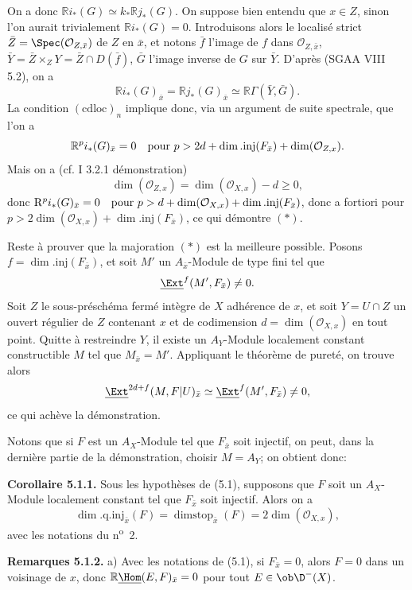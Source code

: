 On a
donc $\mathbb{R} i_*(G)\simeq k_*\mathbb{R} j_*(G)$. On suppose bien entendu que $x\in Z$, sinon l'on aurait trivialement $\mathbb{R} i_*(G)=0$. Introduisons alors le localisé strict $\bar{Z}=\Spec(\mathcal{O}_{Z,\bar{x}})$ de $Z$ en $\bar{x}$, et notons $\bar{f}$ l'image de $f$ dans $\mathcal{O}_{Z,\bar{x}}$, $\bar{Y}=\bar{Z}\times_ZY=\bar{Z}\cap D(\bar{f})$, $\bar{G}$ l'image inverse de $G$ sur $\bar{Y}$. D'après (SGAA VIII 5.2), on a
\[
        \mathbb{R} i_*(G)_{\bar{x}}=\mathbb{R} j_*(G)_{\bar{x}}\simeq \mathbb{R}\Gamma(\bar{Y},\bar{G}).
\]
La condition $(\mathrm{cdloc})_n$ implique donc, via un argument de suite spectrale, que l'on a
\[
        \mathbb{R}^p i_*(G)_{\bar{x}}=0\quad\hbox{pour }p>2d+\dim.\mathrm{inj}(F_{\bar{x}})+\dim(\mathcal{O}_{Z,x}).
\]
Mais on a (cf. I 3.2.1 démonstration)
\[
        \dim(\mathcal{O}_{Z,x})=\dim(\mathcal{O}_{X,x})-d\geq0,
\]
donc $\mathrm{R}^p i_*(G)_{\bar{x}}=0\quad\hbox{pour }p>d+\dim(\mathcal{O}_{X,x})+\dim.\mathrm{inj}(F_{\bar{x}})$,
donc a fortiori pour $p>2\dim(\mathcal{O}_{X,x})+\dim.\mathrm{inj}(F_{\bar{x}})$, ce qui démontre $(*)$.

Reste à prouver que la majoration $(*)$ est la meilleure possible. Posons $f=\dim.\mathrm{inj}(F_{\bar{x}})$, et soit $M'$ un $A_{\bar{x}}$-Module de type fini tel que
\[
        \underline{\Ext}^f(M',F_{\bar{x}})\neq0.
\]
Soit $Z$ le sous-préschéma fermé intègre de $X$ adhérence de $x$, et soit $Y=U\cap Z$ un ouvert régulier de $Z$ contenant $x$ et de codimension $d=\dim(\mathcal{O}_{X,x})$ en tout point. Quitte à restreindre $Y$, il existe un $A_Y$-Module localement constant constructible $M$ tel que $M_{\bar{x}}=M'$. Appliquant le théorème de pureté, on trouve alors
\[
        \underline{\Ext}^{2d+f}(M,F|U)_{\bar{x}}\simeq \underline{\Ext}^f(M',F_{\bar{x}})\neq0,
\]
ce qui achève la démonstration.

Notons que si $F$ est un $A_X$-Module tel que $F_{\bar{x}}$ soit injectif, on peut, dans la dernière partie de la démonstration, choisir $M=A_Y$; on obtient donc:

\textbf{Corollaire 5.1.1.} Sous les hypothèses de (5.1), supposons que $F$ soit un $A_X$-Module localement constant tel que $F_{\bar{x}}$ soit injectif. Alors on a
\[
        \dim.\mathrm{q.inj}_{\bar{x}}(F)=\operatorname{dimstop}_{\bar{x}}(F)=2\dim(\mathcal{O}_{X,x}),
\]
avec les notations du n\textsuperscript{o}~2.

\textbf{Remarques 5.1.2.} a) Avec les notations de (5.1), si $F_{\bar{x}}=0$, alors $F=0$ dans un voisinage de $x$, donc $\mathbb{R}\underline{\Hom}(E,F)_{\bar{x}}=0$ pour tout $E\in\ob\D^{-}(X)$.

